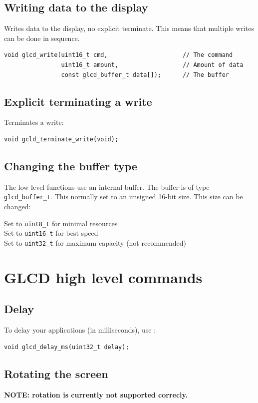 \documentclass[12pt]{article}
\begin{document}
\subsection{Writing data to the display}
Writes data to the display, no explicit terminate. This means that multiple writes can be done in sequence.
\begin{lstlisting}
void glcd_write(uint16_t cmd,                     // The command
                uint16_t amount,                  // Amount of data
                const glcd_buffer_t data[]);      // The buffer
\end{lstlisting}

\subsection{Explicit terminating a write}

Terminates a write:
\begin{lstlisting}
void gcld_terminate_write(void);
\end{lstlisting}

\subsection{Changing the buffer type}
The low level functions use an internal buffer. The buffer is of type \lstinline|glcd_buffer_t|. This normally set to an unsigned 16-bit size. This size can be changed:

Set to \lstinline|uint8_t| for minimal resources\\
Set to \lstinline|uint16_t| for best speed\\
Set to \lstinline|uint32_t| for maximum capacity (not recommended)
 
\section{GLCD high level commands}

\subsection{Delay}

To delay your applications (in milliseconds), use :
\begin{lstlisting}
void glcd_delay_ms(uint32_t delay);
\end{lstlisting}

\subsection{Rotating the screen}
\textbf{NOTE: rotation is currently not supported correcly.}\\
\end{document}
